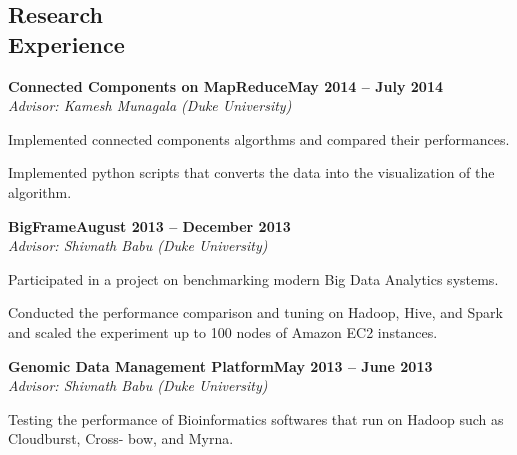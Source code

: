 \documentclass[10pt,margin,line]{cv}
\begin{document}
\begin{resume}
    \section{\mysidestyle Research\\Experience}
    \textbf{Connected Components on MapReduce}\hfill \textbf{May 2014 -- July 2014} \vspace{1mm}\\\vspace{0mm}%
    \textsl{Advisor: Kamesh Munagala (Duke University)}
    \vspace{-2mm}\\\vspace{-1mm}%
    \begin{list3}
        \item Implemented connected components algorthms and compared their performances.
        \item Implemented python scripts that converts the data into the visualization of the algorithm.
    \end{list3}
    \textbf{BigFrame}\hfill \textbf{August 2013 -- December 2013} \vspace{1mm}\\\vspace{0mm}%
    \textsl{Advisor: Shivnath Babu (Duke University)}
    \vspace{-2mm}\\\vspace{-1mm}%
    \begin{list3}
      \item Participated in a project on benchmarking modern Big Data Analytics systems.
        \item Conducted the performance comparison and tuning on Hadoop, Hive, and Spark and scaled the experiment up to 100 nodes of Amazon EC2 instances.
    \end{list3}
    \textbf{Genomic Data Management Platform}\hfill \textbf{May 2013 -- June 2013} \vspace{1mm}\\\vspace{0mm}%
    \textsl{Advisor: Shivnath Babu (Duke University)}
    \vspace{-2mm}\\\vspace{-1mm}%
    \begin{list3}
    \item Testing the performance of Bioinformatics softwares that run on Hadoop such as Cloudburst, Cross-
bow, and Myrna.
    \end{list3}


\end{resume}
\end{document}

